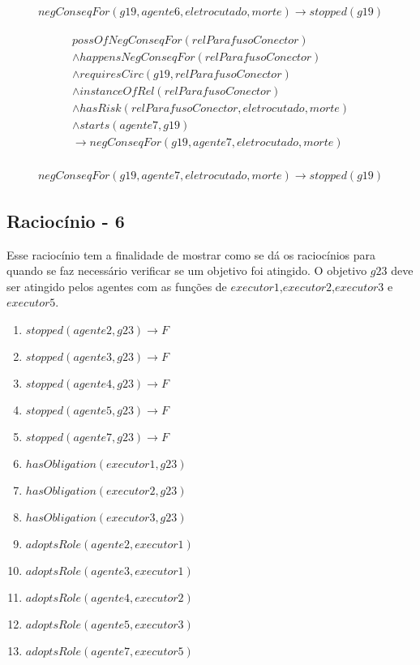 \begin{eqnarray}
	negConseqFor(g19,agente6,eletrocutado,morte) \to stopped(g19)
\end{eqnarray}

\begin{eqnarray}\nonumber
   possOfNegConseqFor(relParafusoConector) \nonumber \\
    \wedge happensNegConseqFor(relParafusoConector) \nonumber \\ 
    \wedge requiresCirc(g19,relParafusoConector) \nonumber \\  
    \wedge instanceOfRel(relParafusoConector) \nonumber \\ 
    \wedge hasRisk(relParafusoConector,eletrocutado,morte) \nonumber \\  
    \wedge starts(agente7,g19) \nonumber \\ 
    \to negConseqFor(g19,agente7,eletrocutado,morte) \\ \nonumber
\end{eqnarray}

\begin{eqnarray}
	negConseqFor(g19,agente7,eletrocutado,morte) \to stopped(g19)
\end{eqnarray}


\subsection{Raciocínio - 6}
\label{raciocinio6}
Esse raciocínio tem a finalidade de mostrar como se dá os raciocínios para quando se faz necessário verificar se um objetivo foi atingido. O objetivo $g23$ deve ser atingido pelos agentes com as funções de $executor1$,$executor2$,$executor3$ e $executor5$. 

\begin{enumerate}
	\item $stopped(agente2,g23) \to F$	
	\item $stopped(agente3,g23) \to F$
	\item $stopped(agente4,g23) \to F$
	\item $stopped(agente5,g23) \to F$
	\item $stopped(agente7,g23) \to F$
	\item $hasObligation(executor1,g23)$	
	\item $hasObligation(executor2,g23)$	
	\item $hasObligation(executor3,g23)$		
	\item $adoptsRole(agente2,executor1)$
	\item $adoptsRole(agente3,executor1)$
	\item $adoptsRole(agente4,executor2)$
	\item $adoptsRole(agente5,executor3)$
	\item $adoptsRole(agente7,executor5)$		
\end{enumerate}

